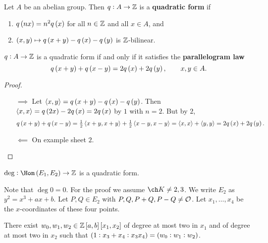 
\begin{definition*}
Let $ A $ be an abelian group. Then $ q : A \to \mathbb{Z} $ is a \textbf{quadratic form} if
\begin{enumerate}
\item $ q\br{nx} = n^2q\br{x} $ for all $ n \in \mathbb{Z} $ and all $ x \in A $, and
\item $ \br{x, y} \mapsto q\br{x + y} - q\br{x} - q\br{y} $ is $ \mathbb{Z} $-bilinear.
\end{enumerate}
\end{definition*}

\begin{lemma}
$ q : A \to \mathbb{Z} $ is a quadratic form if and only if it satisfies the \textbf{parallelogram law}
$$ q\br{x + y} + q\br{x - y} = 2q\br{x} + 2q\br{y}, \qquad x, y \in A. $$
\end{lemma}

\begin{proof}
\hfill
\begin{itemize}
\item[$ \implies $] Let $ \abr{x, y} = q\br{x + y} - q\br{x} - q\br{y} $. Then $ \abr{x, x} = q\br{2x} - 2q\br{x} = 2q\br{x} $ by $ 1 $ with $ n = 2 $. But by $ 2 $,
$$ q\br{x + y} + q\br{x - y} = \tfrac{1}{2}\abr{x + y, x + y} + \tfrac{1}{2}\abr{x - y, x - y} = \abr{x, x} + \abr{y, y} = 2q\br{x} + 2q\br{y}. $$
\item[$ \impliedby $] On example sheet $ 2 $.
\end{itemize}
\end{proof}

\pagebreak

\begin{theorem}
\label{thm:5.6}
$ \deg : \Hom\br{E_1, E_2} \to \ZZ $ is a quadratic form.
\end{theorem}

Note that $ \deg 0 = 0 $. For the proof we assume $ \ch K \ne 2, 3 $. We write $ E_2 $ as $ y^2 = x^3 + ax + b $. Let $ P, Q \in E_2 $ with $ P, Q, P + Q, P - Q \ne \mathcal{O} $. Let $ x_1, \dots, x_4 $ be the $ x $-coordinates of these four points.

\begin{lemma}
\label{lem:5.7}
There exist $ w_0, w_1, w_2 \in \ZZ\sbr{a, b}\sbr{x_1, x_2} $ of degree at most two in $ x_1 $ and of degree at most two in $ x_2 $ such that $ \br{1 : x_3 + x_4 : x_3x_4} = \br{w_0 : w_1 : w_2} $.
\end{lemma}

